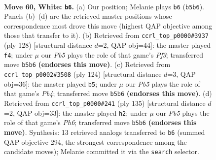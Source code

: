 \documentclass[11pt]{article}
\begin{document}
\clearpage

\begin{figure}[p]\centering
\begin{subfigure}{0.46\textwidth}\centering
\resizebox{\linewidth}{!}{%
\newchessgame
\chessboard[
  setfen={7k/8/8/1P6/R3p1r1/8/4K3/8 w - - 5 60},
  showmover=false,
  pgfstyle=straightmove, color=movearrow, markmove={b5-b6}
]}
\caption{}
\end{subfigure}\hfill
\begin{subfigure}{0.46\textwidth}\centering
\resizebox{\linewidth}{!}{%
\newchessgame
\chessboard[
  setfen={R7/4k3/8/5K2/p7/5P2/r7/8 w - - 9 65},
  showmover=false,
  pgfstyle=straightmove, color=movearrow, markmove={f3-f4}
]}
\caption{}
\end{subfigure}
\\[4pt]
\begin{subfigure}{0.46\textwidth}\centering
\resizebox{\linewidth}{!}{%
\newchessgame
\chessboard[
  setfen={5R2/8/1K6/4k3/1P6/5p2/8/5r2 w - - 0 63},
  showmover=false,
  pgfstyle=straightmove, color=movearrow, markmove={b4-b5}
]}
\caption{}
\end{subfigure}\hfill
\begin{subfigure}{0.46\textwidth}\centering
\resizebox{\linewidth}{!}{%
\newchessgame
\chessboard[
  setfen={1r6/8/8/1P1K2k1/8/7p/8/1R6 b - - 1 68},
  showmover=false,
  pgfstyle=straightmove, color=movearrow, markmove={h3-h2}
]}
\caption{}
\end{subfigure}
\caption{\textbf{Move 60, White: \texttt{b6}.} (a) Our position; Melanie plays \texttt{b6} (\texttt{b5b6}). Panels (b)--(d) are the retrieved master positions whose correspondence most drove this move (highest QAP objective among those that transfer to it). (b) Retrieved from \texttt{ccrl\_top\_p0000\#3937} (ply 128) [structural distance $d$=2, QAP obj=44]: the master played \texttt{f4}; under $\mu$ our \emph{Pb5} plays the role of that game's \emph{Pf3}; transferred move \texttt{b5b6} \textbf{(endorses this move)}. (c) Retrieved from \texttt{ccrl\_top\_p0002\#3508} (ply 124) [structural distance $d$=3, QAP obj=36]: the master played \texttt{b5}; under $\mu$ our \emph{Pb5} plays the role of that game's \emph{Pb4}; transferred move \texttt{b5b6} \textbf{(endorses this move)}. (d) Retrieved from \texttt{ccrl\_top\_p0000\#241} (ply 135) [structural distance $d$=2, QAP obj=33]: the master played \texttt{h2}; under $\mu$ our \emph{Pb5} plays the role of that game's \emph{Ph6}; transferred move \texttt{b5b6} \textbf{(endorses this move)}. Synthesis: 13 retrieved analogs transferred to \texttt{b6} (summed QAP objective 294, the strongest correspondence among the candidate moves); Melanie committed it via the \texttt{search} selector.}
\label{fig:thought-m118}
\end{figure}
\end{document}
